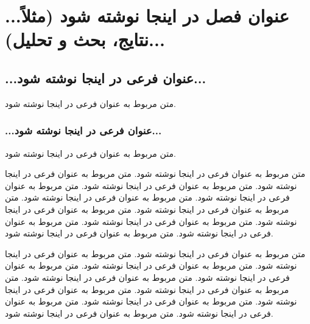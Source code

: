 \chapter{...عنوان فصل در اینجا نوشته شود (مثلاً نتایج، بحث و تحلیل)...}

\section{...عنوان فرعی در اینجا نوشته شود...}

متن مربوط به عنوان فرعی در اینجا نوشته شود.

\subsection{...عنوان فرعی در اینجا نوشته شود...}

متن مربوط به عنوان فرعی در اینجا نوشته شود.

\newpage
متن مربوط به عنوان فرعی در اینجا نوشته شود.
متن مربوط به عنوان فرعی در اینجا نوشته شود.
متن مربوط به عنوان فرعی در اینجا نوشته شود.
متن مربوط به عنوان فرعی در اینجا نوشته شود.
متن مربوط به عنوان فرعی در اینجا نوشته شود.
متن مربوط به عنوان فرعی در اینجا نوشته شود.
متن مربوط به عنوان فرعی در اینجا نوشته شود.
متن مربوط به عنوان فرعی در اینجا نوشته شود.
متن مربوط به عنوان فرعی در اینجا نوشته شود.
متن مربوط به عنوان فرعی در اینجا نوشته شود.

\newpage
متن مربوط به عنوان فرعی در اینجا نوشته شود.
متن مربوط به عنوان فرعی در اینجا نوشته شود.
متن مربوط به عنوان فرعی در اینجا نوشته شود.
متن مربوط به عنوان فرعی در اینجا نوشته شود.
متن مربوط به عنوان فرعی در اینجا نوشته شود.
متن مربوط به عنوان فرعی در اینجا نوشته شود.
متن مربوط به عنوان فرعی در اینجا نوشته شود.
متن مربوط به عنوان فرعی در اینجا نوشته شود.
متن مربوط به عنوان فرعی در اینجا نوشته شود.
متن مربوط به عنوان فرعی در اینجا نوشته شود.
